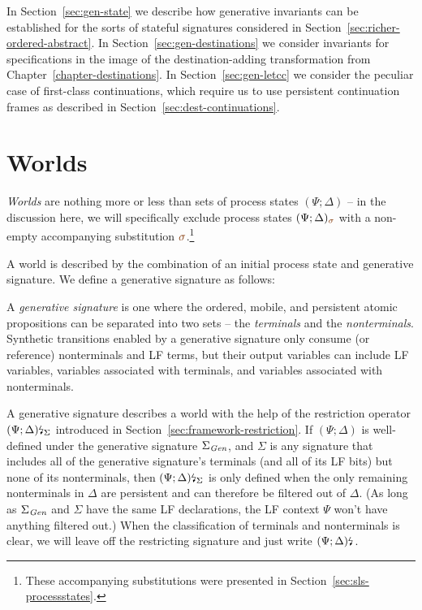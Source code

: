 In Section~\ref{sec:gen-state}
we describe how generative invariants can be established for the sorts
of stateful signatures considered in
Section~\ref{sec:richer-ordered-abstract}. In
Section~\ref{sec:gen-destinations} we consider invariants for
specifications in the image of the destination-adding transformation
from Chapter~\ref{chapter-destinations}.  In
Section~\ref{sec:gen-letcc} we consider the peculiar case of
first-class continuations, which require us to use persistent
continuation frames as described in Section~\ref{sec:dest-continuations}. 

\section{Worlds}
\label{sec:gen-worlds}

{\it Worlds} are nothing more or less than sets of process states
$(\Psi; \Delta)$ -- in the discussion here, we will specifically
exclude process states $(\Psi; \Delta)_{\lf\sigma}$ with a non-empty
accompanying substitution $\lf\sigma$.\footnote{These accompanying
  substitutions were presented in
  Section~\ref{sec:sls-processstates}.}

A world is described by the combination of an initial process state
and generative signature. We define a generative
signature as follows:

\bigskip
\begin{definition}\label{def:gensig}
  A {\em generative signature} is one where the ordered, mobile, and
  persistent atomic propositions can be separated into two sets -- the
  {\em terminals} and the {\em nonterminals}. Synthetic transitions
  enabled by a generative signature only consume (or reference) 
  nonterminals and LF terms, but their output variables can include
  LF variables, variables associated with terminals, and variables
  associated with nonterminals.
\end{definition}
\bigskip

\noindent
A generative signature describes a world with the help of the
restriction operator ${(\Psi; \Delta)}{\mbox{\lightning}}_{\Sigma}$ introduced
in Section~\ref{sec:framework-restriction}. If $(\Psi; \Delta)$ is
well-defined under the generative signature $\Sigma_{\it Gen}$, and
$\Sigma$ is any signature that includes all of the generative
signature's terminals (and all of its LF bits) but none of its
nonterminals, then ${(\Psi; \Delta)}{\mbox{\lightning}}_{\Sigma}$ is only
defined when the only remaining nonterminals in $\Delta$ are
persistent and can therefore be filtered out of $\Delta$. (As long as
$\Sigma_{\it Gen}$ and $\Sigma$ have the same LF declarations, the LF
context $\Psi$ won't have anything filtered out.) When the
classification of terminals and nonterminals is clear, we will leave
off the restricting signature and just write ${(\Psi;
  \Delta)}{\mbox{\lightning}}_{}$.

